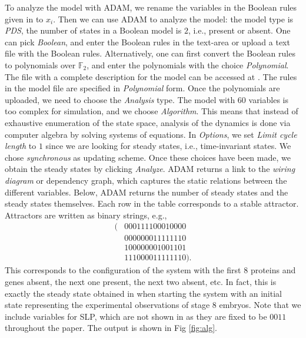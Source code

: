 \documentclass[10pt]{bmc_article}
\begin{document}
To analyze the model with ADAM, we rename the variables in the Boolean rules given in \cite{AO} to $x_i$. Then we can use ADAM to analyze the model: the model type is {\it PDS}, the number of states in a Boolean model is $2$, i.e., present or absent. One can pick {\it Boolean}, and enter the Boolean rules in the text-area or upload a text file with the Boolean rules. Alternatively, one can first convert the Boolean rules to polynomials over $\mathbb F_2$, and enter the polynomials with the choice {\it Polynomial}.
The file with a complete description for the model can be accessed at \cite{DrosophilaModel}. The rules in the model file are specified in {\it Polynomial} form. Once the polynomials are uploaded, we need to choose the {\it Analysis} type. The model with $60$ variables is too complex for simulation, and we choose {\it Algorithm}. This means that instead of exhaustive enumeration of the state space, analysis of the dynamics is done via computer algebra by solving systems of equations.
In {\it Options}, we set {\it Limit cycle length} to $1$ since we are looking for steady states, i.e., time-invariant states.
We chose {\it synchronous} as updating scheme. Once these choices have been made,
we obtain the steady states by clicking {\it Analyze}.
ADAM returns a link to the {\it wiring diagram} or dependency graph, which captures the static relations between the different variables. Below, ADAM returns the number of steady states and the steady states themselves.
Each row in the table corresponds to a stable attractor. Attractors are written as binary strings, e.g.,
\begin{align*}
(&0 0 0 1 1 1 1 0 0 0 1 0 0 0 0\\
&0 0 0 0 0 0 0 1 1 1 1 1 1 1 0\\
&1 0 0 0 0 0 0 0 1 0 0 1 1 0 1\\
&1 1 1 0 0 0 0 1 1 1 1 1 1 1 0).
\end{align*}
This corresponds to the configuration of the system with the first 8 proteins and genes absent, the next one present, the next two absent, etc. In fact, this is exactly the steady state obtained in \cite[Figure 4(b)]{AO} when starting the system with an initial state representing the experimental observations of stage 8 embryos. Note that we include variables for SLP, which are not shown in \cite[Figure 4(b)]{AO} as they are fixed to be $0011$ throughout the paper. The output is shown in Fig \ref{fig:alg}.
\end{document}

